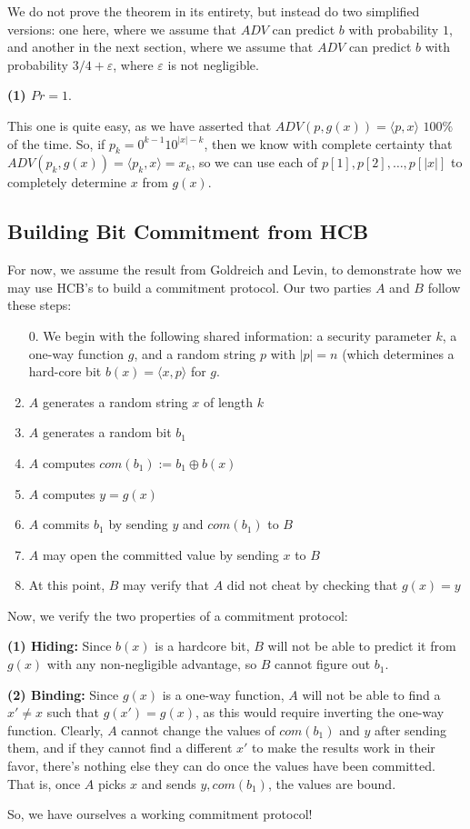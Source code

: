 \documentclass[11pt]{article}
\begin{document}
We do not prove the theorem in its entirety, but instead do two simplified versions: one here, where we assume that \(ADV\) can predict \(b\) with probability \(1\), and another in the next section, where we assume that \(ADV\) can predict \(b\) with probability \(3/4+\varepsilon\), where \(\varepsilon\) is not negligible.\bigskip

\textbf{(1) \(Pr = 1\)}.\smallskip

This one is quite easy, as we have asserted that \(ADV(p,g(x)) = \langle p,x\rangle\) \(100\%\) of the time. So, if \(p_k=0^{k-1}10^{|x|-k}\), then we know with complete certainty that \(ADV(p_k,g(x)) = \langle p_k,x\rangle = x_k\), so we can use each of \(p[1],p[2],\ldots,p[|x|]\) to completely determine \(x\) from \(g(x)\).\medskip


\subsection{Building Bit Commitment from HCB}

For now, we assume the result from Goldreich and Levin, to demonstrate how we may use HCB's to build a commitment protocol. Our two parties \(A\) and \(B\) follow these steps:

\begin{enumerate}
\item[0.] We begin with the following shared information: a security parameter \(k\), a one-way function \(g\), and a random string \(p\) with \(|p|=n\) (which determines a hard-core bit \(b(x)=\langle x,p\rangle\) for \(g\).
\item \(A\) generates a random string \(x\) of length \(k\)
\item \(A\) generates a random bit \(b_1\)
\item \(A\) computes \(com(b_1):=b_1\oplus b(x)\)
\item \(A\) computes \(y=g(x)\)
\item \(A\) commits \(b_1\) by sending \(y\) and \(com(b_1)\) to \(B\)
\item \(A\) may open the committed value by sending \(x\) to \(B\)
\item At this point, \(B\) may verify that \(A\) did not cheat by checking that \(g(x)=y\)
\end{enumerate}

Now, we verify the two properties of a commitment protocol:\medskip

\textbf{(1) Hiding:} Since \(b(x)\) is a hardcore bit, \(B\) will not be able to predict it from \(g(x)\) with any non-negligible advantage, so \(B\) cannot figure out \(b_1\).

\textbf{(2) Binding:} Since \(g(x)\) is a one-way function, \(A\) will not be able to find a \(x'\ne x\) such that \(g(x') = g(x)\), as this would require inverting the one-way function. Clearly, \(A\) cannot change the values of \(com(b_1)\) and \(y\) after sending them, and if they cannot find a different \(x'\) to make the results work in their favor, there's nothing else they can do once the values have been committed. That is, once \(A\) picks \(x\) and sends \(y, com(b_1)\), the values are bound.\bigskip

So, we have ourselves a working commitment protocol!
\end{document}
